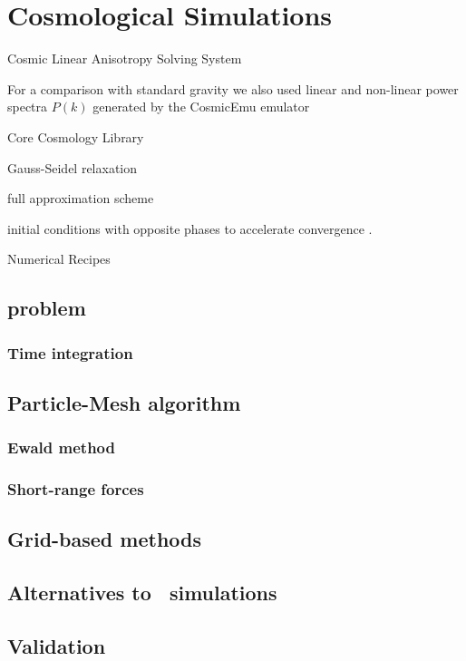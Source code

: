\chapter{Cosmological Simulations}
\textcite{Hockney:1988:CSU:62815}

Cosmic Linear Anisotropy Solving System \parencite[CLASS,][]{class}

For a comparison with standard gravity we also used linear and non-linear power spectra $P(k)$ generated by the CosmicEmu emulator \parencite{Heitmann:2015xma}

Core Cosmology Library \parencite{2018arXiv181205995C}

Gauss-Seidel relaxation \parencite{doi:10.1002/zamm.19720520813}

full approximation scheme \parencite[FAS, see, e.g.,][]{MG_overview}

initial conditions with opposite phases to accelerate convergence \parencite{PhysRevD.93.103519}.

Numerical Recipes \parencite{10.5555/42249}

\section{\nbody problem}
\subsection{Time integration}
\section{Particle-Mesh algorithm}
\subsection{Ewald method}

\subsection{Short-range forces}

\section{Grid-based methods}

\section{Alternatives to \nbody\ simulations}

\section{Validation}